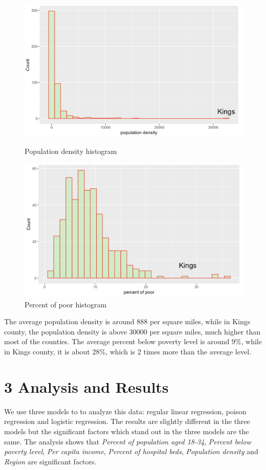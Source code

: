\documentclass[oneside,11pt]{homework}
\begin{document}
\begin{figure}[htbp]
\centering
\begin{minipage}[t]{0.48\textwidth}
\centering
\includegraphics[scale=0.32]{density.png}
\caption{Population density histogram}
\end{minipage}
\begin{minipage}[t]{0.48\textwidth}
\centering
\includegraphics[scale=0.32]{poor.png}
\caption{Percent of poor histogram}
\end{minipage}
\end{figure}

The average population density is around 888 per square miles, while in Kings county, the population density is above 30000 per square miles, much higher than most of the counties. The average percent below
poverty level is around 9\%, while in Kings county, it is about 28\%, which is 2 times more than the average level.

\section*{3 Analysis and Results}
We use three models to to analyze this data: regular linear regression, poison regression and logistic regression. The results are slightly different in the three models but the significant factors which stand out in the three models are the same. The analysis shows that \textit{Percent of population aged 18-34}, \textit{Percent below poverty level}, \textit{Per capita income}, \textit{Percent of hospital beds}, \textit{Population density} and \textit{Region} are significant factors.
\end{document}
